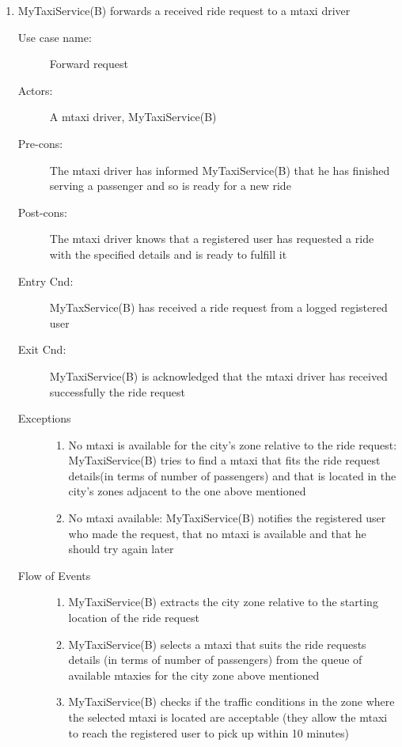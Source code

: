 \documentclass[11pt,titlepage]{article} %
\begin{document}
\begin{enumerate}
	      \item  MyTaxiService(B) forwards a received ride request to a mtaxi driver
		\begin{description}
		        \item [Use case name:] Forward request
		        \item [Actors:] A mtaxi driver, MyTaxiService(B)
		        \item [Pre-cons:] The mtaxi driver has informed MyTaxiService(B) that he has finished serving a passenger and so is
		        ready for a new ride
		        \item [Post-cons:] The mtaxi driver knows that a registered user has requested a ride with the specified
		        details and is ready to fulfill it
		        \item [Entry Cnd:] MyTaxService(B) has received a ride request from a logged registered user
		        \item [Exit Cnd:] MyTaxiService(B) is acknowledged that the mtaxi driver has received successfully the ride request
		        \item [Exceptions]\hfill
			\begin{enumerate}
			          \item No mtaxi is available for the city's zone relative to the ride request: MyTaxiService(B) tries
			          to find a mtaxi that fits the ride request details(in terms of number of passengers) and that is located in the city's zones adjacent
			          to the one above mentioned
			          \item No mtaxi available: MyTaxiService(B) notifies the registered user who made the request, that
			          no mtaxi is available and that he should try again later
			\end{enumerate}
		        \item [Flow of Events]\hfill
			\begin{enumerate}
			          \item MyTaxiService(B) extracts the city zone relative to the starting location of the ride request
			          \item MyTaxiService(B) selects a mtaxi that suits the ride requests details (in terms of number of passengers) from the queue of available mtaxies
			            for the city zone above mentioned
			          \item MyTaxiService(B) checks if the traffic conditions in the zone where the selected mtaxi is located are acceptable
			          (they allow the mtaxi to reach the registered user to pick up within 10 minutes)

\end{enumerate}
\end{description}
\end{enumerate}
\end{document}
